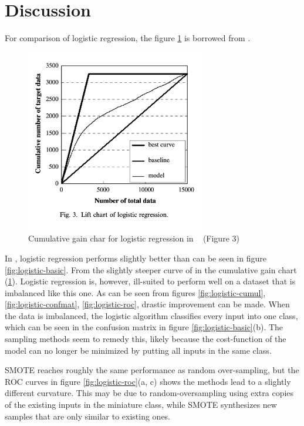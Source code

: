 \section{Discussion}

For comparison of logistic regression, the figure \ref{fig:logistic-comparison} 
is borrowed from \cite{ComparisonData}.
\begin{figure}[H]
\begin{center}
    \includegraphics[width=0.7\textwidth]{figures/logistic_article.png}
\end{center}
\caption[caption]{Cumulative gain char for logistic regression in ~\cite{ComparisonData} (Figure 3)}
\label{fig:logistic-comparison}
\end{figure}

In \cite{ComparisonData}, logistic regression performs slightly better than
can be seen in figure \ref{fig:logistic-basic}. From the slightly steeper
curve of in the cumulative gain chart (\ref{fig:logistic-comparison}). 
Logistic regression is, however, ill-suited to perform well on a dataset
that is imbalanced like this one. As can be seen from figures 
\ref{fig:logistic-cumul}, \ref{fig:logistic-confmat}, \ref{fig:logistic-roc},
drastic improvement can be made. When the data is imbalanced, the logistic
algorithm classifies every input into one class, which can be seen in the
confusion matrix in figure \ref{fig:logistic-basic}(b).
The sampling methods seem to remedy this, likely because the cost-function
of the model can no longer be minimized by putting all inputs in the same class.

SMOTE reaches roughly the same performance as random over-sampling, but the
ROC curves in figure \ref{fig:logistic-roc}(a, c) shows the methods lead to
a slightly different curvature. This may be due to random-oversampling using
extra copies of the existing inputs in the miniature class, while SMOTE
synthesizes new samples that are only similar to existing ones.

